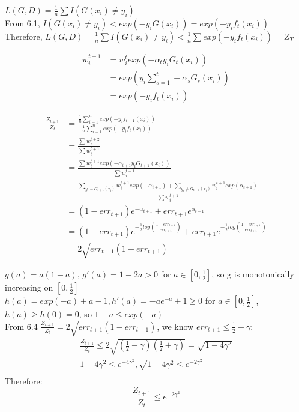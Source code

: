 \documentclass{article}
\newenvironment{sub}[2][$-$]{\begin{trivlist}
		\item[\hskip \labelsep {\bfseries #1}\hskip \labelsep {\bfseries #2.}]}  {\end{trivlist}}
\begin{document}
\begin{sub}{6.2}
\end{sub}
$L(G,D) = \frac{1}{n} \sum I(G(x_i) \neq y_i)$\\
From 6.1, $ I(G(x_i) \neq y_i) < exp(-y_iG(x_i)) = exp(-y_if_t(x_i))$\\
Therefore, $L(G,D) = \frac{1}{n} \sum I(G(x_i) \neq y_i) < \frac{1}{n} \sum exp(-y_if_t(x_i)) = Z_T $

\begin{sub}{6.3}
\end{sub}
\begin{align}
w_i^{t+1} &= w_i^t exp(-\alpha_t y_i G_t(x_i))\\
&= exp(y_i\sum_{s=1}^{t}-\alpha_s G_s(x_i))\\
&= exp(-y_i f_t(x_i))
\end{align}


\begin{sub}{6.4}
\end{sub}
\begin{align}
\frac{Z_{t+1}}{Z_t} &= \frac{\frac{1}{n} \sum_{i=1}^{n} exp(-y_if_{t+1}(x_i))}{\frac{1}{n} \sum_{i=1}^{n} exp(-y_if_{t}(x_i))} \\
& = \frac{\sum w_i^{t+2}}{\sum w_i^{t+1}}\\
& = \frac{\sum w_i^{t+1} exp(-\alpha_{t+1} y_i G_{t+1}(x_i))}{\sum w_i^{t+1}} \\
& = \frac{\sum_{y_i = G_{t+1}(x_i)} w_i^{t+1} exp(-\alpha_{t+1}) + \sum_{y_i \neq G_{t+1}(x_i)} w_i^{t+1} exp(\alpha_{t+1}) }{\sum w_i^{t+1}} \\
&= (1- err_{t+1}) e^{-\alpha_{t+1}} + err_{t+1} e^{\alpha_{t+1}}\\
&= (1- err_{t+1}) e^{-\frac{1}{2} log(\frac{1- err_{t+1}}{err_{t+1}})} +err_{t+1} e^{-\frac{1}{2} log(\frac{1- err_{t+1}}{err_{t+1}})   }\\
& = 2\sqrt{ err_{t+1}(1- err_{t+1})} 
\end{align}

\begin{sub}{6.5}
\end{sub}
$g(a) = a(1-a)$, $g'(a) = 1-2a >0$ for $a \in [0, \frac{1}{2}] $, so g is monotonically increasing on $[0, \frac{1}{2}]$\\
$h(a) = exp(-a)+a -1, h'(a) = -ae^{-a} +1 \geq 0$ for $a \in [0, \frac{1}{2}] $, $h(a) \geq h(0) = 0$, so $1 - a \leq exp(-a)$\\
From 6.4  $\frac{Z_{t+1}}{Z_t} = 2\sqrt{ err_{t+1}(1- err_{t+1})} $, we know $err_{t+1} \leq \frac{1}{2}- \gamma $:
\begin{align}
\frac{Z_{t+1}}{Z_t}  \leq 2 \sqrt{(\frac{1}{2}- \gamma)(\frac{1}{2}+ \gamma)} =  \sqrt{1 - 4\gamma^2}\\
1- 4 \gamma^2 \leq e^{-4\gamma^2}, \sqrt{1 - 4\gamma^2} \leq e^{-2\gamma^2}\\
\end{align}
Therefore:
$$\frac{Z_{t+1}}{Z_t}  \leq  e^{-2\gamma^2}$$
\end{document}
